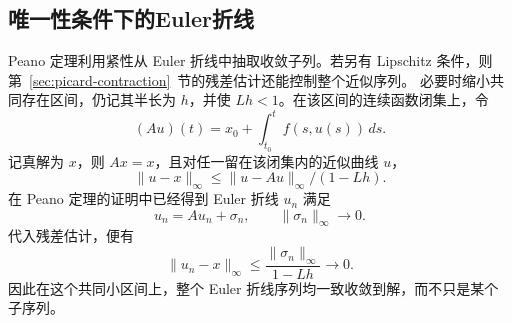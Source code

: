 \subsection*{唯一性条件下的Euler折线}
Peano 定理利用紧性从 Euler 折线中抽取收敛子列。若另有 Lipschitz 条件，则第~\ref{sec:picard-contraction}~节的残差估计还能控制整个近似序列。
必要时缩小共同存在区间，仍记其半长为 $h$，并使 $Lh<1$。在该区间的连续函数闭集上，令
\[
 (Au)(t)=x_0+\int_{t_0}^tf(s,u(s))\,ds.
\]
记真解为 $x$，则 $Ax=x$，且对任一留在该闭集内的近似曲线 $u$，
\[
 \|u-x\|_\infty\leq\|u-Au\|_\infty/(1-Lh).
\]
在 Peano 定理的证明中已经得到 Euler 折线 $u_n$ 满足
\[
 u_n=Au_n+\sigma_n,\qquad\|\sigma_n\|_\infty\longrightarrow0.
\]
代入残差估计，便有
\[
 \|u_n-x\|_\infty\leq\frac{\|\sigma_n\|_\infty}{1-Lh}\longrightarrow0.
\]
因此在这个共同小区间上，整个 Euler 折线序列均一致收敛到解，而不只是某个子序列。
